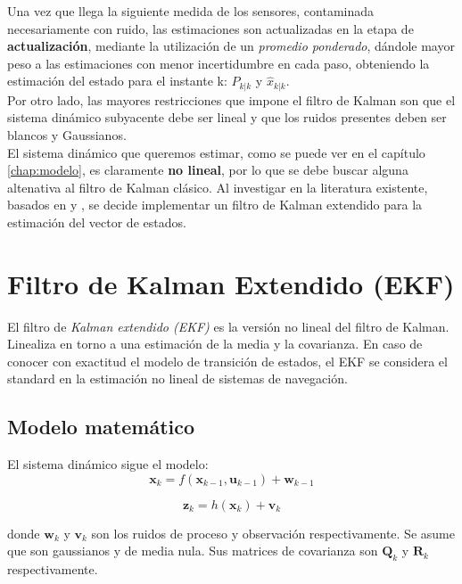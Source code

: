 \documentclass[main]{subfiles}
\begin{document}
Una vez que llega la siguiente medida de los sensores, contaminada necesariamente con ruido, las estimaciones son actualizadas en la etapa de \textbf{actualización}, mediante la utilización de un \emph{promedio ponderado}, dándole mayor peso a las estimaciones con menor incertidumbre en cada paso, obteniendo la estimación del estado para el instante k: $P_{k|k}$ y $\hat{x}_{k|k}$.\\

Por otro lado, las mayores restricciones que impone el filtro de Kalman son que el sistema dinámico subyacente debe ser lineal y que los ruidos presentes deben ser blancos y Gaussianos.\\

El sistema dinámico que queremos estimar, como se puede ver en el capítulo \ref{chap:modelo}, es claramente \textbf{no lineal}, por lo que se debe buscar alguna altenativa al filtro de Kalman clásico. Al investigar en la literatura existente, basados en \cite{bib:kalman} y \cite{bib:kalman2}, se decide implementar un filtro de Kalman extendido para la estimación del vector de estados.

\section{Filtro de Kalman Extendido (EKF)}

El filtro de \emph{Kalman extendido (EKF)} es la versión no lineal del filtro de Kalman. Linealiza en torno a una estimación de la media y la covarianza. En caso de conocer con exactitud el modelo de transición de estados, el EKF se considera el standard en la estimación no lineal de sistemas de navegación.\\

\subsection{Modelo matemático}

El sistema dinámico sigue el modelo:\\

$$\mathbf{x}_{k} = f(\mathbf{x}_{k-1}, \mathbf{u}_{k-1}) + \mathbf{w}_{k-1}$$

$$\mathbf{z}_{k} = h(\mathbf{x}_{k}) + \mathbf{v}_{k}$$

donde $\mathbf{w}_k$ y $\mathbf{v}_k$ son los ruidos de proceso y observación respectivamente. Se asume que son gaussianos y de media nula. Sus matrices de covarianza son $\mathbf{Q}_k$ y $\mathbf{R}_k$ respectivamente.
\end{document}
